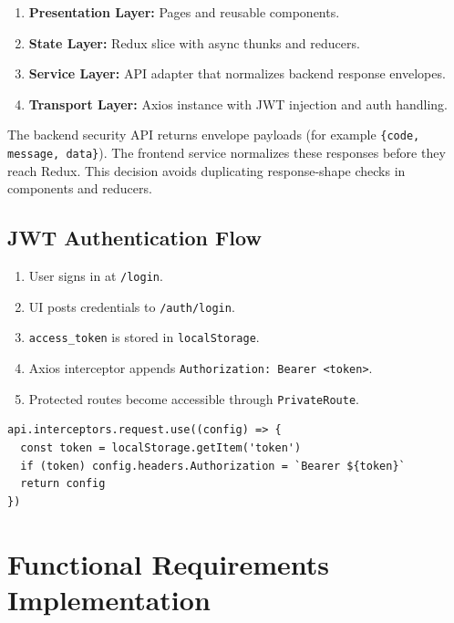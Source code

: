 \documentclass[10pt,a4paper,twocolumn]{article}
\begin{document}
\begin{enumerate}
  \item \textbf{Presentation Layer:} Pages and reusable components.
  \item \textbf{State Layer:} Redux slice with async thunks and reducers.
  \item \textbf{Service Layer:} API adapter that normalizes backend response envelopes.
  \item \textbf{Transport Layer:} Axios instance with JWT injection and auth handling.
\end{enumerate}

\begin{warningbox}
The backend security API returns envelope payloads
(for example \texttt{\{code, message, data\}}). The frontend service
normalizes these responses before they reach Redux. This decision avoids
duplicating response-shape checks in components and reducers.
\end{warningbox}

\subsection{JWT Authentication Flow}

\begin{enumerate}
  \item User signs in at \texttt{/login}.
  \item UI posts credentials to \texttt{/auth/login}.
  \item \texttt{access\_token} is stored in \texttt{localStorage}.
  \item Axios interceptor appends \texttt{Authorization: Bearer <token>}.
  \item Protected routes become accessible through \texttt{PrivateRoute}.
\end{enumerate}

\begin{lstlisting}[style=jscode, caption={Axios interceptor strategy (simplified)}]
api.interceptors.request.use((config) => {
  const token = localStorage.getItem('token')
  if (token) config.headers.Authorization = `Bearer ${token}`
  return config
})
\end{lstlisting}

\section{Functional Requirements Implementation}
\end{document}
